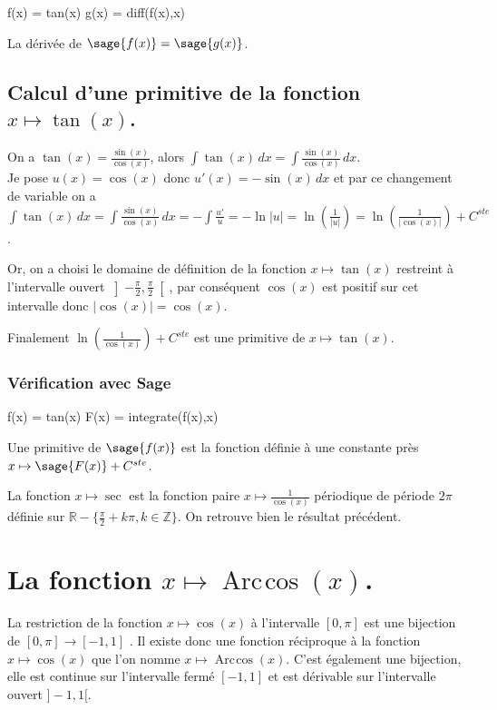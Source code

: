 \documentclass[a4paper,12pt]{report}
\def\eclaire{\mathbb}
\def\R{\ensuremath{\eclaire R}}
\def\Z{\ensuremath{\eclaire Z}}
\renewcommand{\arccos}{\mathop{\mathrm{Arc\mspace{2mu}cos}}}
\begin{document}
\begin{sageblock}
    f(x) = tan(x)
    g(x) = diff(f(x),x) 
\end{sageblock}

La dérivée de $\sage{f(x)} = \sage{g(x)} $.


\subsection{Calcul d'une primitive de la fonction  $x \mapsto \tan(x)$.}

On a $\tan(x)=\frac{\sin(x)}{\cos(x)}$, alors $\int \tan(x) \, dx =\int \frac{\sin(x)}{\cos(x)}\, dx$.\\
Je pose $u(x)=\cos(x)$ donc $u'(x)= -\sin(x) \,dx$ et par ce changement de variable on a $\int \tan(x) \, dx = \int \frac{\sin(x)}{\cos(x)}\, dx  = -\int \frac{u'}{u} = -\ln|u|  = \ln\left(\frac{1}{|u|}\right)  = \ln\left(\frac{1}{|\cos(x)|}\right) +C^{ste}$.

Or, on a choisi le domaine de définition de la fonction $x \mapsto \tan(x)$ restreint à l'intervalle ouvert $ \left] -\frac{\pi}{ 2} , \frac{\pi}{ 2} \right[ $, par conséquent $\cos(x)$ est positif sur cet intervalle donc $|\cos(x)| = \cos(x)$.

Finalement $ \ln\left(\frac{1}{\cos(x)}\right) +C^{ste}$ est une primitive de $x \mapsto \tan(x)$.


\subsubsection*{Vérification avec Sage}

\begin{sageblock}
    f(x) = tan(x)
    F(x) = integrate(f(x),x)
\end{sageblock}

Une primitive de $\sage{f(x)}$ est la fonction définie à une constante près $x \mapsto \sage{F(x)} + C^{ste} $.

La fonction $x\mapsto \sec$ est la fonction paire $x\mapsto \frac{1}{\cos(x)}$ périodique de période $2\pi$ définie sur $\R-\{ \frac{\pi}{2}+k\pi, k\in\Z\}$. On retrouve bien le résultat précédent.


\section{La fonction  $x \mapsto \arccos(x) $.}


La restriction de la fonction $x \mapsto \cos(x) $ à l'intervalle $[0,\pi]$ est une bijection de $[0,\pi] \rightarrow [-1,1]$ . Il existe donc une fonction réciproque à la fonction $x \mapsto \cos(x) $ que l'on nomme $x \mapsto \arccos(x) $. C'est également une bijection, elle est continue sur l'intervalle fermé  $ [-1,1]$ et est dérivable sur l'intervalle ouvert $]-1,1[$.
\end{document}
